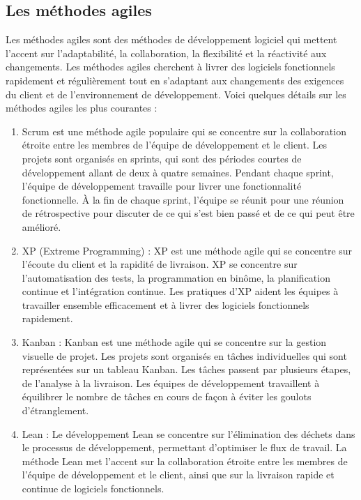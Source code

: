 \subsection{Les méthodes agiles}\label{subsec:methode-agiles}
Les méthodes agiles sont des méthodes de développement logiciel qui mettent l'accent sur l'adaptabilité, la collaboration, la flexibilité et la réactivité aux changements. Les méthodes agiles cherchent à livrer des logiciels fonctionnels rapidement et régulièrement tout en s'adaptant aux changements des exigences du client et de l'environnement de développement. Voici quelques détails sur les méthodes agiles les plus courantes :
\begin{enumerate}
    \item Scrum est une méthode agile populaire qui se concentre sur la collaboration étroite entre les membres de l'équipe de développement et le client. Les projets sont organisés en sprints, qui sont des périodes courtes de développement allant de deux à quatre semaines. Pendant chaque sprint, l'équipe de développement travaille pour livrer une fonctionnalité fonctionnelle. À la fin de chaque sprint, l'équipe se réunit pour une réunion de rétrospective pour discuter de ce qui s'est bien passé et de ce qui peut être amélioré.
    \item XP (Extreme Programming) : XP est une méthode agile qui se concentre sur l'écoute du client et la rapidité de livraison. XP se concentre sur l'automatisation des tests, la programmation en binôme, la planification continue et l'intégration continue. Les pratiques d'XP aident les équipes à travailler ensemble efficacement et à livrer des logiciels fonctionnels rapidement.
    \item Kanban : Kanban est une méthode agile qui se concentre sur la gestion visuelle de projet. Les projets sont organisés en tâches individuelles qui sont représentées sur un tableau Kanban. Les tâches passent par plusieurs étapes, de l'analyse à la livraison. Les équipes de développement travaillent à équilibrer le nombre de tâches en cours de façon à éviter les goulots d'étranglement.
    \item Lean : Le développement Lean se concentre sur l'élimination des déchets dans le processus de développement, permettant d'optimiser le flux de travail. La méthode Lean met l'accent sur la collaboration étroite entre les membres de l'équipe de développement et le client, ainsi que sur la livraison rapide et continue de logiciels fonctionnels.
\end{enumerate}

